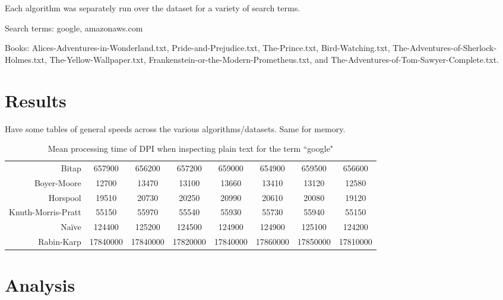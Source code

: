 \documentclass{article}
\begin{document}
Each algorithm was separately run over the dataset for a variety of search terms.

Search terms: google, amazonaws.com

Books: Alices-Adventures-in-Wonderland.txt, Pride-and-Prejudice.txt, The-Prince.txt, Bird-Watching.txt, The-Adventures-of-Sherlock-Holmes.txt, The-Yellow-Wallpaper.txt, Frankenstein-or-the-Modern-Prometheus.txt, and The-Adventures-of-Tom-Sawyer-Complete.txt.

\section{Results}
Have some tables of general speeds across the various algorithms/datasets. Same for memory.

\newcommand*\rot{\rotatebox{90}}

\begin{table}[hbt]
  \centering
  \begin{tabular}{r|ccccccc}
    & \rot{Alices-Adventures-in-Wonderland} & \rot{Bird-Watching} & \rot{Frankenstein-or-the-Modern-Prometheus} &  \rot{Pride-and-Prejudice} & \rot{The-Adventures-of-Sherlock-Holmes} & \rot{The-Adventures-of-Tom-Sawyer-Complete} & \rot{The-Yellow-Wallpaper}\\
    \hline
    Bitap & 657900 & 656200 & 657200 & 659000 & 654900 & 659500 & 656600 \\
    Boyer-Moore & 12700 & 13470 & 13100 & 13660 & 13410 & 13120 & 12580 \\
    Horspool & 19510 & 20730 & 20250 & 20990 & 20610 & 20080 & 19120 \\
    Knuth-Morris-Pratt & 55150 & 55970 & 55540 & 55930 & 55730 & 55940 & 55150 \\
    Na{\"i}ve & 124400 & 125200 & 124500 & 124900 & 124900 & 125100 & 124200 \\
    Rabin-Karp & 17840000 & 17840000 & 17820000 & 17840000 &  17860000 & 17850000 & 17810000
  \end{tabular}
  \caption{Mean processing time of DPI when inspecting plain text for the term ``google"}
\end{table}


\section{Analysis}
\end{document}

